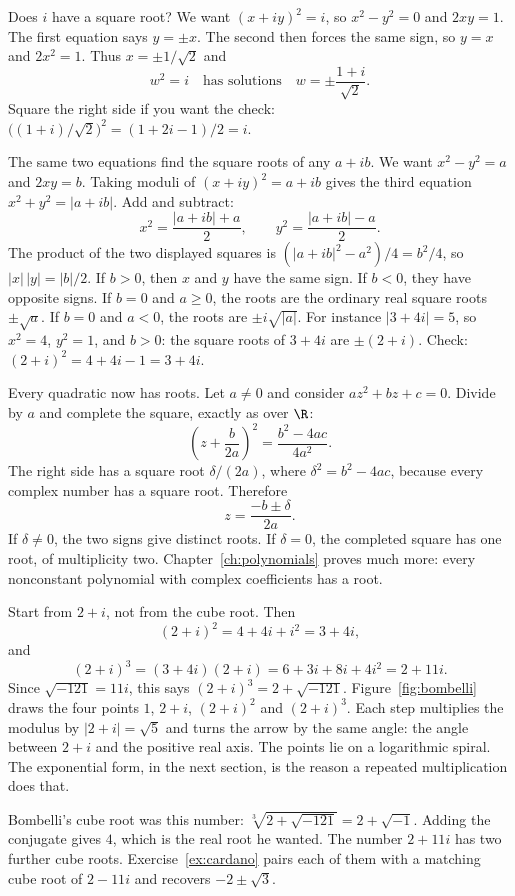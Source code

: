 \begin{examplex}
Does $i$ have a square root? We want $(x+iy)^2=i$, so $x^2-y^2=0$ and $2xy=1$. The first equation says $y=\pm x$. The second then forces the same sign, so $y=x$ and $2x^2=1$. Thus $x=\pm1/\sqrt2$ and
\[
w^2=i\quad\text{has solutions}\quad w=\pm\frac{1+i}{\sqrt2}.
\]
Square the right side if you want the check: $\bigl((1+i)/\sqrt2\bigr)^2=(1+2i-1)/2=i$.

The same two equations find the square roots of any $a+ib$. We want $x^2-y^2=a$ and $2xy=b$. Taking moduli of $(x+iy)^2=a+ib$ gives the third equation $x^2+y^2=|a+ib|$. Add and subtract:
\[
x^2=\frac{|a+ib|+a}2,\qquad y^2=\frac{|a+ib|-a}2.
\]
The product of the two displayed squares is $(|a+ib|^2-a^2)/4=b^2/4$, so $|x|\,|y|=|b|/2$. If $b>0$, then $x$ and $y$ have the same sign. If $b<0$, they have opposite signs. If $b=0$ and $a\ge0$, the roots are the ordinary real square roots $\pm\sqrt a$. If $b=0$ and $a<0$, the roots are $\pm i\sqrt{|a|}$. For instance $|3+4i|=5$, so $x^2=4$, $y^2=1$, and $b>0$: the square roots of $3+4i$ are $\pm(2+i)$. Check: $(2+i)^2=4+4i-1=3+4i$.

Every quadratic now has roots. Let $a\ne0$ and consider $az^2+bz+c=0$. Divide by $a$ and complete the square, exactly as over $\R$:
\[
\left(z+\frac{b}{2a}\right)^2=\frac{b^2-4ac}{4a^2}.
\]
The right side has a square root $\delta/(2a)$, where $\delta^2=b^2-4ac$, because every complex number has a square root. Therefore
\[
z=\frac{-b\pm\delta}{2a}.
\]
If $\delta\ne0$, the two signs give distinct roots. If $\delta=0$, the completed square has one root, of multiplicity two. Chapter~\ref{ch:polynomials} proves much more: every nonconstant polynomial with complex coefficients has a root.
\end{examplex}

\begin{examplex}
Start from $2+i$, not from the cube root. Then
\[
(2+i)^2=4+4i+i^2=3+4i,
\]
and
\[
(2+i)^3=(3+4i)(2+i)=6+3i+8i+4i^2=2+11i.
\]
Since $\sqrt{-121}=11i$, this says $(2+i)^3=2+\sqrt{-121}$. Figure~\ref{fig:bombelli} draws the four points $1$, $2+i$, $(2+i)^2$ and $(2+i)^3$. Each step multiplies the modulus by $|2+i|=\sqrt5$ and turns the arrow by the same angle: the angle between $2+i$ and the positive real axis. The points lie on a logarithmic spiral. The exponential form, in the next section, is the reason a repeated multiplication does that.

Bombelli's cube root was this number: $\sqrt[3]{2+\sqrt{-121}}=2+\sqrt{-1}$. Adding the conjugate gives $4$, which is the real root he wanted. The number $2+11i$ has two further cube roots. Exercise~\ref{ex:cardano} pairs each of them with a matching cube root of $2-11i$ and recovers $-2\pm\sqrt3$.
\end{examplex}

